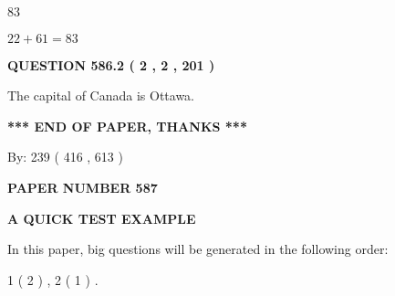 \documentclass[12pt]{article}
\begin{document}
83
 
 
 
 
\noindent{}

$ %
22 +  %
61=   %
83$
 
 
  
\vspace{0.2in}
  
{\textbf{\Large{QUESTION
586.2 
 ( 2 , 2 , 201 )
}}}
  
  
 
 
\noindent{}
 
 
The capital of Canada is Ottawa.
 
 
 
 
   
   
 \vspace{0.2in}
 
   
   
   
   
\vspace{1.0in} 
{\textbf{\large{ *** END OF PAPER, THANKS *** }}} 
   
   
\hspace{1.0in} By: 
 239 ( 416 ,  613 )
   
   
   
   
\newpage 
\setcounter{page}{ 
   587001 } 
   
   
   
   
 {\textbf{ \Large{ PAPER NUMBER  587  }}}
   
   
\vspace{0.2in}
   
   
   
   
   
   
 \vspace{0.2in}
{\LARGE {\textbf{ A QUICK TEST EXAMPLE}}}
   
   
   
\vspace{0.2in}
   
In this paper, big questions will be generated in the following order: 
   
   
   1 ( 2 )
 ,
   2 ( 1 )
 .
  
\vspace{0.2in}
  
\end{document}
